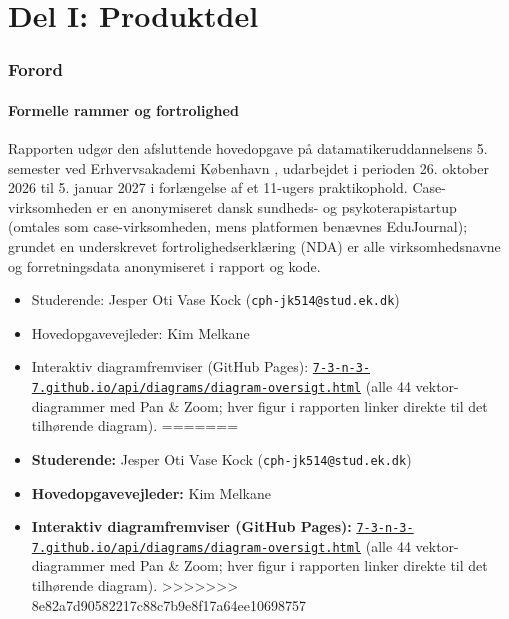 \documentclass[11pt,a4paper]{article}
\newcommand{\diagramviewerurl}{https://7-3-n-3-7.github.io/api/diagrams/diagram-oversigt.html}
\begin{document}
\setcounter{page}{2}

{\singlespacing \tableofcontents}
\newpage

\part*{Del I: Produktdel}

\section{Forord}

\subsection{Formelle rammer og fortrolighed}
Rapporten udgør den afsluttende hovedopgave på datamatikeruddannelsens 5. semester ved Erhvervsakademi København \cite{ek_studieordning2024}, udarbejdet i perioden 26. oktober 2026 til 5. januar 2027 i forlængelse af et 11-ugers praktikophold. Case-virksomheden er en anonymiseret dansk sundheds- og psykoterapistartup (omtales som case-virksomheden, mens platformen benævnes EduJournal); grundet en underskrevet fortrolighedserklæring (NDA) er alle virksomhedsnavne og forretningsdata anonymiseret i rapport og kode.
\begin{itemize}[noitemsep]
<<<<<<< HEAD
    \item Studerende: Jesper Oti Vase Kock (\texttt{cph-jk514@stud.ek.dk})
    \item Hovedopgavevejleder: Kim Melkane
    \item Interaktiv diagramfremviser (GitHub Pages):\newline
    \href{\diagramviewerurl}{\nolinkurl{7-3-n-3-7.github.io/api/diagrams/diagram-oversigt.html}}\newline
    (alle 44 vektor-diagrammer med Pan \& Zoom; hver figur i rapporten linker direkte til det tilhørende diagram).
=======
    \item \textbf{Studerende:} Jesper Oti Vase Kock (\texttt{cph-jk514@stud.ek.dk})
    \item \textbf{Hovedopgavevejleder:} Kim Melkane
    \item \textbf{Interaktiv diagramfremviser (GitHub Pages):} \href{\diagramviewerurl}{\texttt{7-3-n-3-7.github.io/api/diagrams/diagram-oversigt.html}} (alle 44 vektor-diagrammer med Pan \& Zoom; hver figur i rapporten linker direkte til det tilhørende diagram).
>>>>>>> 8e82a7d90582217c88c7b9e8f17a64ee10698757
\end{itemize}
\end{document}
